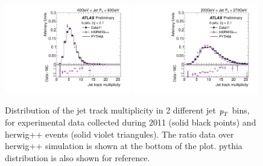 \begin{figure}[tp]
\centering
\includegraphics[width=0.49\textwidth]{FIGS/systematics/DataVarNtrkPT040.pdf}
\includegraphics[width=0.49\textwidth]{FIGS/systematics/DataVarNtrkPT200.pdf}
\caption{Distribution of the jet track multiplicity in 2 different jet ${\emph{p}_{T}}$ bins, for experimental data  collected during 2011 (solid black points) and {\sc herwig}++ events (solid violet triangules). The ratio data over {\sc herwig}++ simulation is shown at the bottom of the plot. {\sc pythia} distribution is also shown for reference.}
\label{fig:herwigdatamc}
\end{figure}



